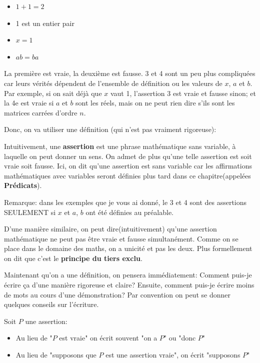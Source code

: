 \documentclass{article}
\begin{document}
\begin{itemize}
  \item $1+1=2$
  \item 1 est un entier pair
  \item $x=1$
  \item $ab = ba$
\end{itemize}

La première est vraie, la deuxième est fausse. 3 et 4 sont un peu plus compliquées car leurs vérités dépendent de l'ensemble de définition ou les valeurs de $x$, $a$ et $b$. Par exemple, si on sait déjà que $x$ vaut 1, l'assertion 3 est vraie et fausse sinon; et la 4e est vraie si $a$ et $b$ sont les réels, mais on ne peut rien dire s'ils sont les matrices carrées d'ordre $n$.



Donc, on va utiliser une définition (qui n'est pas vraiment rigoreuse):
\begin{tcolorbox}[colback=red!5!white,colframe=red!75!black,title=Définition 1.1]
  Intuitivement, une \textbf{assertion} est une phrase mathématique sans variable, à laquelle on peut donner un sens. On admet de plus qu'une telle assertion est soit vraie soit fausse.
  \tcblower
  Ici, on dit qu'une assertion est sans variable car les affirmations mathématiques avec variables seront définies plus tard dans ce chapitre(appelées \textbf{Prédicats}).
\end{tcolorbox}

Remarque: dans les exemples que je vous ai donné, le 3 et 4 sont des assertions SEULEMENT si $x$ et $a$, $b$ ont été définies au préalable.

D'une manière similaire, on peut dire(intuitivement) qu'une assertion mathématique ne peut pas être vraie et fausse simultanément. Comme on se place dans le domaine des maths, on a unicité et pas les deux. Plus formellement on dit que c'est le \textbf{principe du tiers exclu}.

Maintenant qu'on a une définition, on pensera immédiatement: Comment puis-je écrire ça d'une manière rigoreuse et claire? Ensuite, comment puis-je écrire moins de mots au cours d'une démonstration? Par convention on peut se donner quelques conseils sur l'écriture. 

Soit $P$ une assertion:
\begin{itemize}
  \item Au lieu de "$P$ est vraie" on écrit souvent "on a $P$" ou "donc $P$"
  \item Au lieu de "supposons que $P$ est une assertion vraie", on écrit "supposons $P$" 
\end{itemize}
\end{document}
